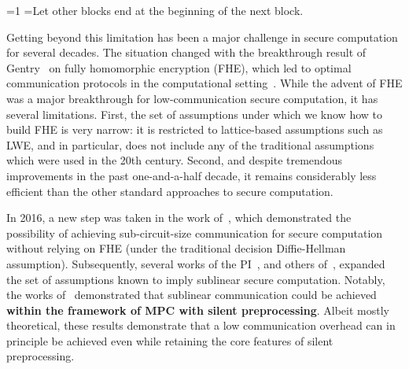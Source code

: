 \documentclass[oneside, a4paper, onecolumn, 11pt]{article}
\newcounter{alphasect}
\def\alphainsection{0}
\newenvironment{alphasection}{%
  \ifnum\alphainsection=1%
    \errhelp={Let other blocks end at the beginning of the next block.}
    \errmessage{Nested Alpha section not allowed}
  \fi%
  \setcounter{alphasect}{0}
  \def\alphainsection{1}
}{%
  \setcounter{alphasect}{0}
  \def\alphainsection{0}
}%
\begin{document}
\begin{alphasection}
Getting beyond this limitation has been a major challenge in secure computation for several decades. \iffalse Early positive results required exponential computation~\cite{C:BFKR90,STOC:NaoNis01}, or were limited to very simple functions such as point functions~\cite{FOCS:CGKS95, FOCS:KusOst97, STOC:ChoGil97} or constant-depth circuits~\cite{C:BarIsh05}.\fi The situation changed with the breakthrough result of Gentry~\cite{STOC:Gentry09} on fully homomorphic encryption (FHE), which led to optimal communication protocols in the computational setting~\cite{TCC:DamFauHaz12,EC:AJLTVW12}. While the advent of FHE was a major breakthrough for low-communication secure computation, it has several limitations. First, the set of assumptions under which we know how to build FHE is very narrow: it is restricted to lattice-based assumptions such as LWE, and in particular, does not include any of the traditional assumptions which were used in the 20th century. Second, and despite tremendous improvements in the past one-and-a-half decade, it remains considerably less efficient than the other standard approaches to secure computation.

In 2016, a new step was taken in the work of~\cite{C:BoyGilIsh16}, which demonstrated the possibility of achieving sub-circuit-size communication for secure computation without relying on FHE (under the traditional decision Diffie-Hellman assumption). Subsequently, several works of the PI~\cite{EC:Couteau19, EC:CouMey21, TCC:BoyCouMey22}, and others of~\cite{EC:OrlSchYak21,C:RoySin21}, expanded the set of assumptions known to imply sublinear secure computation. Notably, the works of~\cite{EC:Couteau19, EC:CouMey21} demonstrated that sublinear communication could be achieved \textbf{within the framework of MPC with silent preprocessing}. Albeit mostly theoretical, these results demonstrate that a low communication overhead can in principle be achieved even while retaining the core features of silent preprocessing.


\end{alphasection}
\end{document}
